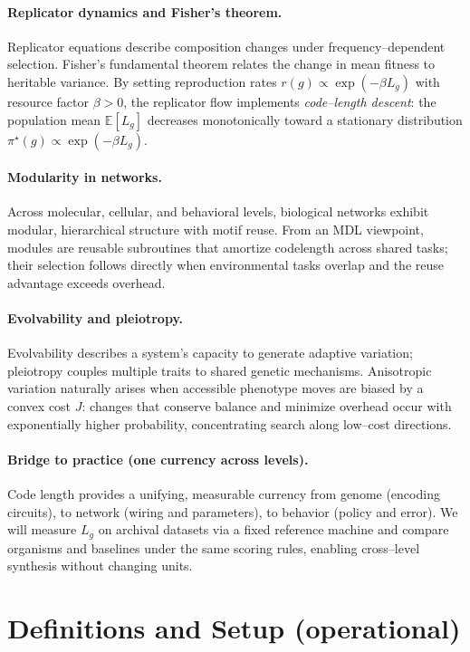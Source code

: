 \documentclass[11pt,a4paper]{article}
\newcommand{\E}{\mathbb{E}}
\begin{document}
\paragraph{Replicator dynamics and Fisher’s theorem.}
Replicator equations describe composition changes under frequency–dependent selection. Fisher’s fundamental theorem relates the change in mean fitness to heritable variance. By setting reproduction rates $r(g)\propto \exp(-\beta L_g)$ with resource factor $\beta>0$, the replicator flow implements \emph{code–length descent}: the population mean $\E[L_g]$ decreases monotonically toward a stationary distribution $\pi^\star(g)\propto \exp(-\beta L_g)$.

\paragraph{Modularity in networks.}
Across molecular, cellular, and behavioral levels, biological networks exhibit modular, hierarchical structure with motif reuse. From an MDL viewpoint, modules are reusable subroutines that amortize codelength across shared tasks; their selection follows directly when environmental tasks overlap and the reuse advantage exceeds overhead.

\paragraph{Evolvability and pleiotropy.}
Evolvability describes a system’s capacity to generate adaptive variation; pleiotropy couples multiple traits to shared genetic mechanisms. Anisotropic variation naturally arises when accessible phenotype moves are biased by a convex cost $J$: changes that conserve balance and minimize overhead occur with exponentially higher probability, concentrating search along low–cost directions.

\paragraph{Bridge to practice (one currency across levels).}
Code length provides a unifying, measurable currency from genome (encoding circuits), to network (wiring and parameters), to behavior (policy and error). We will measure $L_g$ on archival datasets via a fixed reference machine and compare organisms and baselines under the same scoring rules, enabling cross–level synthesis without changing units.

\section{Definitions and Setup (operational)}
\end{document}
